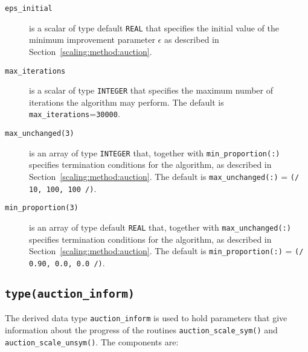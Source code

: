 \begin{description}

\item[\texttt{eps\_initial}] is a scalar of type default \texttt{REAL} that specifies the initial value of the minimum improvement parameter $\epsilon$ as described in Section~\ref{scaling:method:auction}.

\item[\texttt{max\_iterations}] is a scalar of type \texttt{INTEGER} that specifies the maximum number of iterations the algorithm may perform. The default is \texttt{max\_iterations}=\texttt{30000}.

\item[\texttt{max\_unchanged(3)}] is an array of type \texttt{INTEGER} that, together with \texttt{min\_proportion(:)} specifies termination conditions for the algorithm, as described in Section~\ref{scaling:method:auction}. The default is \texttt{max\_unchanged(:)} = \texttt{(/ 10, 100, 100 /)}.

\item[\texttt{min\_proportion(3)}] is an array of type default \texttt{REAL} that, together with \texttt{max\_unchanged(:)} specifies termination conditions for the algorithm, as described in Section~\ref{scaling:method:auction}. The default is \texttt{min\_proportion(:)} = \texttt{(/ 0.90, 0.0, 0.0 /)}.

\end{description}

\subsection{\texttt{type(auction\_inform)}} \label{scaling:type:auction_inform}

The derived data type \texttt{auction\_inform} is used to hold parameters that
give information about the progress of the routines
\texttt{auction\_scale\_sym()} and \texttt{auction\_scale\_unsym()}. The components are:

